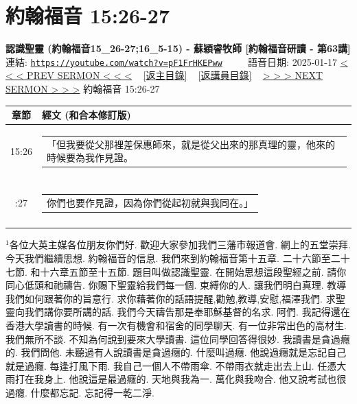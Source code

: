 \documentclass{book}
\begin{document}
\section{約翰福音 15:26-27}
\label{sec:pF1FrHKEPww}
\textbf{認識聖靈 (約翰福音15\_26-27;16\_5-15) - 蘇穎睿牧師 [約翰福音研讀 - 第63講]}
\newline
\newline
連結: \href{https://youtube.com/watch?v=pF1FrHKEPww}{\texttt{https://youtube.com/watch?v=pF1FrHKEPww}} ~~~~ 語音日期: 2025-01-17
\newline
\newline
\hyperref[sec:GDV7iT9TooA]{< < < PREV SERMON < < <}
~
\hyperlink{toc}{[返主目錄]}
~
\hyperref[ch:preacher10]{[返講員目錄]}
~
\hyperref[sec:M4alGuubf1o]{> > > NEXT SERMON > > >}
\newline
\newline
約翰福音 15:26-27
\newline
\begin{longtable}{cl}
\hline
\hline
章節 & 經文 (和合本修訂版)\\
\hline
15:26 & \begin{tabularx}{0.7\textwidth}{X} 「但我要從父那裡差保惠師來，就是從父出來的那真理的靈，他來的時候要為我作見證。 \end{tabularx} \\ \\ \relax
15:27 & \begin{tabularx}{0.7\textwidth}{X} 你們也要作見證，因為你們從起初就與我同在。」 \end{tabularx} \\ \\
[1ex]
\hline
\hline
\end{longtable}
$^{1}$各位大英主媒各位朋友你們好.
歡迎大家參加我們三藩市報道會.
網上的五堂崇拜.
今天我們繼續思想.
約翰福音的信息.
我們來到約翰福音第十五章.
二十六節至二十七節.
和十六章五節至十五節.
題目叫做認識聖靈.
在開始思想這段聖經之前.
請你同心低頭和祂禱告.
你賜下聖靈給我們每一個.
束縛你的人.
讓我們明白真理.
教導我們如何跟著你的旨意行.
求你藉著你的話語提醒,勸勉,教導,安慰,福澤我們.
求聖靈向我們講你要所講的話.
我們今天禱告那是奉耶穌基督的名求.
阿們.
我記得還在香港大學讀書的時候.
有一次有機會和宿舍的同學聊天.
有一位非常出色的高材生.
我們無所不談.
不知為何說到要來大學讀書.
這位同學回答得很妙.
我讀書是貪過癮的.
我們問他.
未聽過有人說讀書是貪過癮的.
什麼叫過癮.
他說過癮就是忘記自己就是過癮.
每逢打風下雨.
我自己一個人不帶雨傘.
不帶雨衣就走出去上山.
任憑大雨打在我身上.
他說這是最過癮的.
天地與我為一.
萬化與我吻合.
他又說考試也很過癮.
什麼都忘記.
忘記得一乾二淨.
\end{document}
